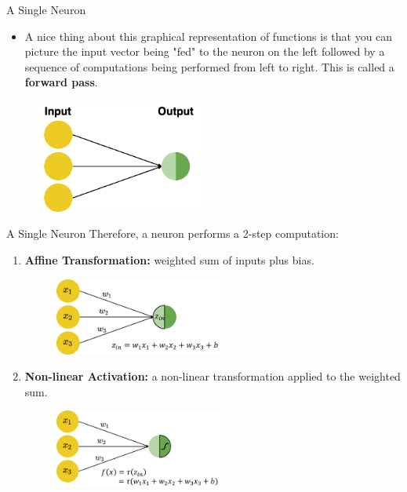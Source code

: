 \begin{vbframe} {A Single Neuron}
\begin{itemize}
\item A nice thing about this graphical representation of functions is that you can picture the input vector being "fed" to the neuron on the left followed by a sequence of computations being performed from left to right. This is called a \textbf{forward pass}.
\end{itemize}
\vspace{1cm}
\begin{figure}
\includegraphics[width=5.5cm]{figure/forward_pass.png}
\end{figure}
\end{vbframe}

\begin{frame} {A Single Neuron}
Therefore, a neuron performs a 2-step computation:
\begin{enumerate}
\item \textbf{Affine Transformation:} weighted sum of inputs plus bias.
\begin{figure}
\includegraphics[width=5.5cm]{figure/step1-zin.jpg}
\end{figure}
\item \textbf{Non-linear Activation:} a non-linear transformation applied to the weighted sum.
\begin{figure}
\includegraphics[width=5.5cm]{figure/step2-zin.jpg}
\end{figure}
\end{enumerate}
\end{frame}

